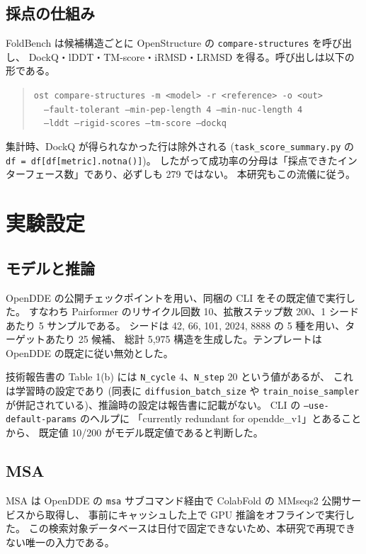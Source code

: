 \documentclass[11pt,a4paper]{article}
\begin{document}
\subsection{採点の仕組み}

FoldBench は候補構造ごとに OpenStructure の \texttt{compare-structures} を呼び出し、
DockQ・lDDT・TM-score・iRMSD・LRMSD を得る。呼び出しは以下の形である。

\begin{quote}\small
\texttt{ost compare-structures -m <model> -r <reference> -o <out>}\\
\texttt{\ \ --fault-tolerant --min-pep-length 4 --min-nuc-length 4}\\
\texttt{\ \ --lddt --rigid-scores --tm-score --dockq}
\end{quote}

集計時、DockQ が得られなかった行は除外される
(\texttt{task\_score\_summary.py} の \texttt{df = df[df[metric].notna()]})。
したがって成功率の分母は「採点できたインターフェース数」であり、必ずしも 279 ではない。
本研究もこの流儀に従う。

\section{実験設定}

\subsection{モデルと推論}

OpenDDE の公開チェックポイントを用い、同梱の CLI をその既定値で実行した。
すなわち Pairformer のリサイクル回数 10、拡散ステップ数 200、1 シードあたり 5 サンプルである。
シードは 42, 66, 101, 2024, 8888 の 5 種を用い、ターゲットあたり 25 候補、
総計 5,975 構造を生成した。テンプレートは OpenDDE の既定に従い無効とした。

技術報告書の Table 1(b) には \texttt{N\_cycle} 4、\texttt{N\_step} 20 という値があるが、
これは学習時の設定であり (同表に \texttt{diffusion\_batch\_size} や
\texttt{train\_noise\_sampler} が併記されている)、推論時の設定は報告書に記載がない。
CLI の \texttt{--use-default-params} のヘルプに
「currently redundant for opendde\_v1」とあることから、
既定値 10/200 がモデル既定値であると判断した。

\subsection{MSA}

MSA は OpenDDE の \texttt{msa} サブコマンド経由で ColabFold の MMseqs2 公開サービスから取得し、
事前にキャッシュした上で GPU 推論をオフラインで実行した。
この検索対象データベースは日付で固定できないため、本研究で再現できない唯一の入力である。
\end{document}
